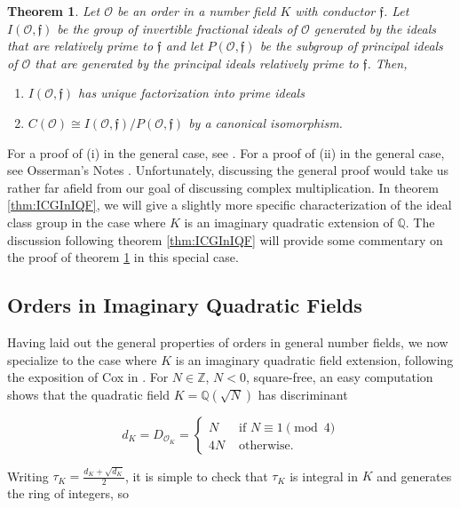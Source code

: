 \documentclass{amsart}
\newtheorem{thm}{Theorem}[section]
\theoremstyle{definition}
\theoremstyle{remark}
\numberwithin{equation}{section}
\newcommand{\cO}{\mathcal O}
\newcommand{\fkf}{\mathfrak f}
\newcommand{\bbQ}{\mathbb Q}
\newcommand{\bbZ}{\mathbb Z}
\begin{document}
\begin{thm} \label{thm:RelPrimeToConductor}
Let $\cO$ be an order in a number field $K$ with conductor $\fkf$. Let $I(\cO, \fkf)$ be the group of invertible fractional ideals of $\cO$ generated by the ideals that are relatively prime to $\fkf$ and let $P(\cO, \fkf)$ be the subgroup of principal ideals of $\cO$ that are generated by the principal ideals relatively prime to $\fkf$. Then,
\begin{enumerate}
\item $I(\cO, \fkf)$ has unique factorization into prime ideals
\item $C(\cO) \cong I(\cO, \fkf)/P(\cO, \fkf)$ by a canonical isomorphism.
\end{enumerate}
\end{thm}

For a proof of (i) in the general case, see \cite{NeukirchANT}. %
For a proof of (ii) in the general case, see Osserman's Notes \cite{OssermanOrders}.
 Unfortunately, discussing the general proof would take us rather far afield from our goal of discussing complex multiplication. In theorem \ref{thm:ICGInIQF}, we will give a slightly more specific characterization of the ideal class group in the case where $K$ is an imaginary quadratic extension of $\bbQ$. The discussion following theorem \ref{thm:ICGInIQF} will provide some commentary on the proof of theorem \ref{thm:RelPrimeToConductor} in this special case.

\subsection{Orders in Imaginary Quadratic  Fields} \label{sec:OrdersInIQF}

Having laid out the general properties of orders in general number fields, we now specialize to the case where $K$ is an imaginary quadratic field extension, following the exposition of Cox in \cite{CoxPrimes}. For $N \in \bbZ$, $N < 0$, square-free, an easy computation shows that the quadratic field $K = \bbQ(\sqrt{N})$ has discriminant

\[
d_{K} = D_{\cO_{K}} =  
				\begin{cases} 
						N  &   \text{ if } N \equiv 1 \pmod{4}\\
						4N &   \text{ otherwise.}
        \end{cases}
\]

Writing $\tau_{K} = \frac{d_{K} + \sqrt{d_{K}}}{2}$, it is simple to check that $\tau_{K}$ is integral in $K$ and generates the ring of integers, so 
\end{document}
